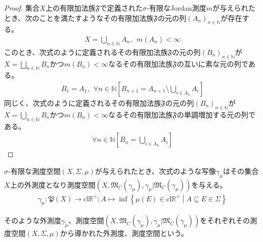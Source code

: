 \documentclass[dvipdfmx]{jsarticle}
\begin{document}
\begin{proof}
集合$X$上の有限加法族$\mathfrak{F}$で定義された$\sigma$-有限なJordan測度$m$が与えられたとき、次のことを満たすようなその有限加法族$\mathfrak{F}$の元の列$\left( A_{n} \right)_{n \in \mathbb{N}}$が存在する。
\begin{align*}
X = \bigcup_{n \in \mathbb{N}} A_{n},\ \ m\left( A_{n} \right) < \infty
\end{align*}
このとき、次式のように定義されるその有限加法族$\mathfrak{F}$の元の列$\left( B_{n} \right)_{n \in \mathbb{N}}$が$X = \bigsqcup_{n \in \mathbb{N}} B_{n}$かつ$m\left( B_{n} \right) < \infty$なるその有限加法族$\mathfrak{F}$の互いに素な元の列である。
\begin{align*}
B_{1} = A_{1},\ \ \forall n \in \mathbb{N}\left[ B_{n + 1} = A_{n + 1} \setminus \bigcup_{i \in \varLambda_{n}} A_{i} \right]
\end{align*}
同じく、次式のように定義されるその有限加法族$\mathfrak{F}$の元の列$\left( B_{n} \right)_{n \in \mathbb{N}}$が$X = \bigcup_{n \in \mathbb{N}} B_{n}$かつ$m\left( B_{n} \right) < \infty$なるその有限加法族$\mathfrak{F}$の単調増加する元の列である。
\begin{align*}
\forall n \in \mathbb{N}\left[ B_{n} = \bigcup_{i \in \varLambda_{n}} A_{i} \right]
\end{align*}
\end{proof}
\begin{thm}\label{4.5.3.23}
$\sigma$-有限な測度空間$(X,\varSigma,\mu)$が与えられたとき、次式のような写像$\gamma_{\mu}$はその集合$X$上の外測度となり測度空間$\left( X,\mathfrak{M}_{C}\left( \gamma_{\mu} \right),\gamma_{\mu}|\mathfrak{M}_{C}\left( \gamma_{\mu} \right) \right)$を与える。
\begin{align*}
\gamma_{\mu}\mathfrak{:P}(X) \rightarrow \mathrm{cl}\mathbb{R}^{+};A \mapsto \inf\left\{ \mu(E) \in \mathrm{cl}\mathbb{R}^{+} \middle| A \subseteq E \in \varSigma \right\}
\end{align*}
\end{thm}
\begin{dfn}
そのような外測度$\gamma_{\mu}$、測度空間$\left( X,\mathfrak{M}_{C}\left( \gamma_{\mu} \right),\gamma_{\mu}|\mathfrak{M}_{C}\left( \gamma_{\mu} \right) \right)$をそれぞれその測度空間$(X,\varSigma,\mu)$から導かれた外測度、測度空間という。
\end{dfn}
\end{document}
